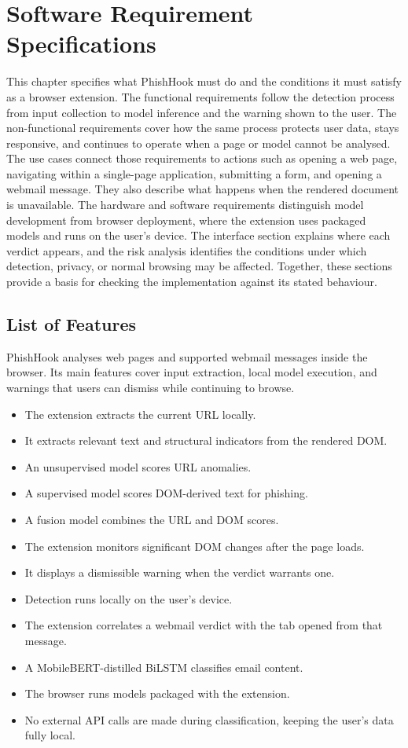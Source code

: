 \documentclass{FastFyp}
\begin{document}
\chapter{Software Requirement Specifications}
\label{ch:srs}
This chapter specifies what PhishHook must do and the conditions it must satisfy as a browser extension. The functional requirements follow the detection process from input collection to model inference and the warning shown to the user. The non-functional requirements cover how the same process protects user data, stays responsive, and continues to operate when a page or model cannot be analysed. The use cases connect those requirements to actions such as opening a web page, navigating within a single-page application, submitting a form, and opening a webmail message. They also describe what happens when the rendered document is unavailable. The hardware and software requirements distinguish model development from browser deployment, where the extension uses packaged models and runs on the user's device. The interface section explains where each verdict appears, and the risk analysis identifies the conditions under which detection, privacy, or normal browsing may be affected. Together, these sections provide a basis for checking the implementation against its stated behaviour.

\section{List of Features}
PhishHook analyses web pages and supported webmail messages inside the browser. Its main features cover input extraction, local model execution, and warnings that users can dismiss while continuing to browse.
\begin{itemize}
    \item The extension extracts the current URL locally.
    \item It extracts relevant text and structural indicators from the rendered DOM.
    \item An unsupervised model scores URL anomalies.
    \item A supervised model scores DOM-derived text for phishing.
    \item A fusion model combines the URL and DOM scores.
    \item The extension monitors significant DOM changes after the page loads.
    \item It displays a dismissible warning when the verdict warrants one.
    \item Detection runs locally on the user's device.
    \item The extension correlates a webmail verdict with the tab opened from that message.
    \item A MobileBERT-distilled BiLSTM classifies email content.
    \item The browser runs models packaged with the extension.
     \item No external API calls are made during classification, keeping the user's data fully local.
\end{itemize}
\end{document}
